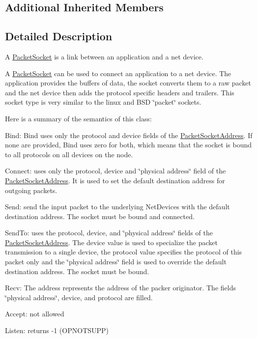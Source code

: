 \subsection*{Additional Inherited Members}


\subsection{Detailed Description}
A \hyperlink{classns3_1_1PacketSocket}{Packet\+Socket} is a link between an application and a net device. 

A \hyperlink{classns3_1_1PacketSocket}{Packet\+Socket} can be used to connect an application to a net device. The application provides the buffers of data, the socket converts them to a raw packet and the net device then adds the protocol specific headers and trailers. This socket type is very similar to the linux and B\+SD \char`\"{}packet\char`\"{} sockets.

Here is a summary of the semantics of this class\+:
\begin{DoxyItemize}
\item Bind\+: Bind uses only the protocol and device fields of the \hyperlink{classns3_1_1PacketSocketAddress}{Packet\+Socket\+Address}. If none are provided, Bind uses zero for both, which means that the socket is bound to all protocols on all devices on the node.
\item Connect\+: uses only the protocol, device and \char`\"{}physical address\char`\"{} field of the \hyperlink{classns3_1_1PacketSocketAddress}{Packet\+Socket\+Address}. It is used to set the default destination address for outgoing packets.
\item Send\+: send the input packet to the underlying Net\+Devices with the default destination address. The socket must be bound and connected.
\item Send\+To\+: uses the protocol, device, and \char`\"{}physical address\char`\"{} fields of the \hyperlink{classns3_1_1PacketSocketAddress}{Packet\+Socket\+Address}. The device value is used to specialize the packet transmission to a single device, the protocol value specifies the protocol of this packet only and the \char`\"{}physical address\char`\"{} field is used to override the default destination address. The socket must be bound.
\item Recv\+: The address represents the address of the packer originator. The fields \char`\"{}physical address\char`\"{}, device, and protocol are filled.
\item Accept\+: not allowed
\item Listen\+: returns -\/1 (O\+P\+N\+O\+T\+S\+U\+PP)
\end{DoxyItemize}

